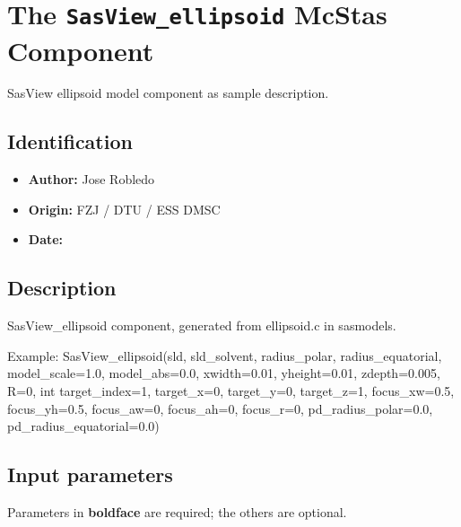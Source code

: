 \section{The \texttt{SasView\_ellipsoid} McStas Component}
SasView ellipsoid model component as sample description.

\subsection*{Identification}
\begin{itemize}
  \item \textbf{Author:} Jose Robledo
  \item \textbf{Origin:} FZJ / DTU / ESS DMSC
  \item \textbf{Date:} 
\end{itemize}

\subsection*{Description}
SasView\_ellipsoid component, generated from ellipsoid.c in sasmodels.

Example: SasView\_ellipsoid(sld, sld\_solvent, radius\_polar, radius\_equatorial, model\_scale=1.0, model\_abs=0.0, xwidth=0.01, yheight=0.01, zdepth=0.005, R=0, int target\_index=1, target\_x=0, target\_y=0, target\_z=1, focus\_xw=0.5, focus\_yh=0.5, focus\_aw=0, focus\_ah=0, focus\_r=0, pd\_radius\_polar=0.0, pd\_radius\_equatorial=0.0)

\subsection*{Input parameters}
Parameters in \textbf{boldface} are required; the others are optional.

